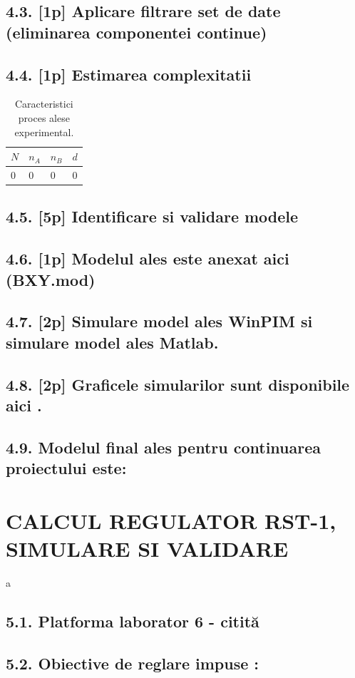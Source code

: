 \documentclass[12pt,english]{article}
\begin{document}
\subsection {4.3. [1p] Aplicare filtrare set de date (eliminarea componentei continue) }
\subsection {4.4. [1p] Estimarea complexitatii}
\begin{table}[H]
  \centering
  \begin{tabular}{|l|l|l|l|}
    \hline
    $N$ & $n_A$ & $n_B$ & $d$ \\
    \hline
    0 & 0 & 0 & 0 \\
    \hline
  \end{tabular}
  \caption{Caracteristici proces alese experimental.}
\end{table}

\subsection {4.5. [5p]  Identificare si validare modele }
\subsection {4.6. [1p] Modelul ales este anexat aici (BXY.mod) }
\subsection {4.7. [2p] Simulare model ales WinPIM si simulare model ales Matlab. }
\subsection {4.8. [2p]  Graficele simularilor sunt disponibile aici .  }
\subsection {4.9. Modelul final ales pentru continuarea proiectului este: }

\section {CALCUL REGULATOR RST-1, SIMULARE SI VALIDARE }
a
\subsection {5.1. Platforma laborator 6 - citită }
\subsection {5.2.  Obiective de reglare impuse  : }
\end{document}
